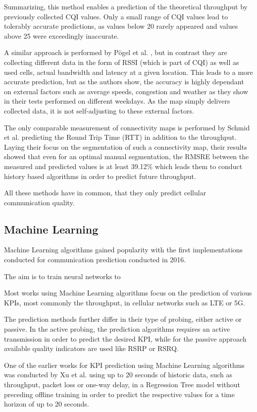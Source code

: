 \documentclass[conference]{IEEEtran}
\begin{document}
Summarizing, this method enables a prediction of the theoretical throughput by previously collected  CQI values. Only a small range of CQI values lead to tolerably accurate predictions, as values below 20 rarely appeared and values above 25 were exceedingly inaccurate.

A similar approach is performed by Pögel et al. \cite{pogelPrediction3GNetwork2012}, but in contrast they are collecting different data in the form of RSSI (which is part of CQI) as well as used cells, actual bandwidth and latency at a given location. This leads to a more accurate prediction, but as the authors show, the accuracy is highly dependant on external factors such as average speeds, congestion and weather as they show in their tests performed on different weekdays. As the map simply delivers collected data, it is not self-adjusting to these external factors.

The only comparable measurement of connectivity maps is performed by Schmid et al. \cite{schmidPassiveMonitoringGeobased2018} predicting the Round Trip Time (RTT) in addition to the throughput. Laying their focus on the segmentation of such a connectivity map, their results showed that even for an optimal manual segmentation, the RMSRE between the measured and predicted values is at least 39.12\% which leads them to conduct history based algorithms in order to predict future throughput.

All these methods have in common, that they only predict cellular communication quality.

\subsection{Machine Learning}
Machine Learning algorithms gained popularity with the first implementations conducted for communication prediction conducted in 2016.

The aim is to train neural networks to 

Most works using Machine Learning algorithms focus on the prediction of various KPIs, most commonly the throughput, in cellular networks such as LTE or 5G.

The prediction methods further differ in their type of probing, either active or passive. In the active probing, the prediction algorithms requires an active transmission in order to predict the desired KPI, while for the passive approach available quality indicators are used like RSRP or RSRQ.

One of the earlier works for KPI prediction using Machine Learning algorithms was conducted by Xu et al. \cite{xuPROTEUSNetworkPerformance2013} using up to 20 seconds of historic data, such as throughput, packet loss or one-way delay, in a Regression Tree model without preceding offline training in order to predict the respective values for a time horizon of up to 20 seconds.
\end{document}

